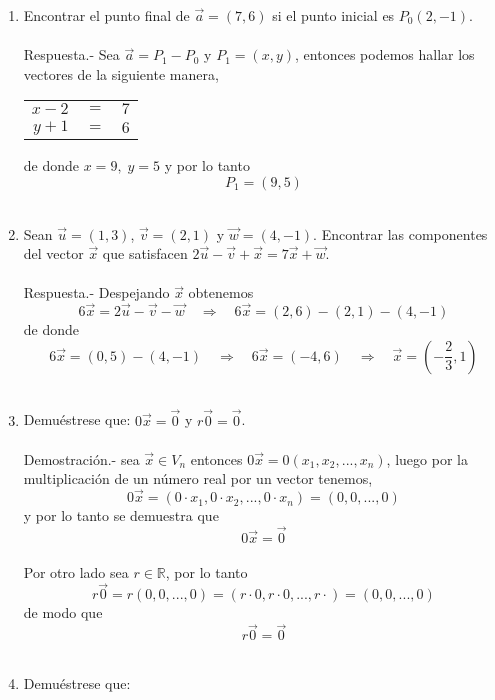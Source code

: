 \begin{enumerate}

\item Encontrar el punto final de $\vec{a}=(7,6)$ si el punto inicial es $P_0(2,-1)$.\\\\
    Respuesta.-\; Sea $\vec{a}=P_1-P_0$ y $P_1=(x,y)$, entonces podemos hallar los vectores de la siguiente manera,
    \begin{center}
    \begin{tabular}{rcl}
	$x-2$&$=$&$7$\\
	$y+1$&$=$&$6$\\
    \end{tabular}
    \end{center}
    de donde $x=9, \; y=5$ y por lo tanto $$P_1=(9,5)$$\\

\item Sean $\vec{u}=(1,3)$,  $\vec{v}=(2,1)$ y $\vec{w}=(4,-1)$. Encontrar las componentes del vector $\vec{x}$ que satisfacen $2\vec{u}-\vec{v}+\vec{x}=7\vec{x}+\vec{w}$.\\\\
    Respuesta.-\; Despejando $\vec{x}$ obtenemos $$6\vec{x}=2\vec{u}-\vec{v}-\vec{w} \quad \Longrightarrow\quad 6\vec{x}=(2,6)-(2,1)-(4,-1)$$ 
    de donde $$6\vec{x}=(0,5)-(4,-1)\quad \Longrightarrow \quad 6\vec{x}=(-4,6) \quad \Longrightarrow \quad \vec{x}=\left(-\dfrac{2}{3},1\right)$$\\

\item Demuéstrese que: $0\vec{x}=\vec{0}$ y $r\vec{0}=\vec{0}$.\\\\
    Demostración.-\; sea $\vec{x}\in V_n$ entonces $0\vec{x}=0(x_1,x_2,...,x_n)$, luego por la multiplicación de un número real por un vector tenemos, $$0\vec{x}=(0\cdot x_1,0\cdot x_2,...,0\cdot x_n)=(0,0,...,0)$$
    y por lo tanto se demuestra que $$0\vec{x}=\vec{0}$$\\
    Por otro lado sea $r\in \mathbb{R}$, por lo tanto $$r\vec{0}=r(0,0,...,0)=(r\cdot 0,r\cdot 0,...,r\cdot)=(0,0,...,0)$$
    de modo que $$r\vec{0}=\vec{0}$$\\

\item Demuéstrese que:
\begin{enumerate}[\bfseries a)]


\end{enumerate}
\end{enumerate}

